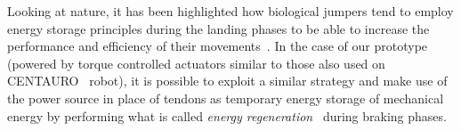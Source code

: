 Looking at nature, it has been highlighted how biological jumpers tend to employ energy storage principles during the landing phases to be able to increase the performance and efficiency of their movements~\cite{biomech::anderson1993storage,biomech::biewener1981elastic}. In the case of our prototype (powered by torque controlled actuators similar to those also used on CENTAURO~\cite{misc::kashiri2019centauro} robot), it is possible to exploit a similar strategy and make use of the power source in place of tendons as temporary energy storage of mechanical energy by performing what is called \textit{energy regeneration}~\cite{reg_braking::yoong2010studies,reg_braking::seok2014design} during braking phases.

